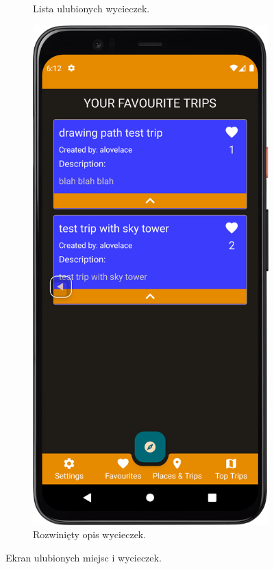 \begin{figure}[H]
\begin{subfigure}[b]{0.3\textwidth}
                \caption{Lista ulubionych wycieczek.\label{fav_trip1}}
            \end{subfigure}
            \hfill
            \begin{subfigure}[b]{0.3\textwidth}
                \centering
                \includegraphics[width=\textwidth]{src/app/fav_trips2.png}
                \caption{Rozwinięty opis wycieczek.\label{fav_trip2}}
            \end{subfigure}
            \caption{Ekran ulubionych miejsc i wycieczek.\label{fav}}
            \qquad
        \end{figure} 
        \vspace{1cm}
        
